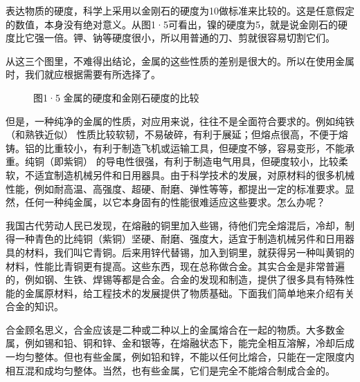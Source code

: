 表达物质的硬度，科学上采用以金刚石的硬度为10做标准来比较的。这是任意假定的数值，本身没有绝对意义。从图1·5可看出，镍的硬度为5，就是说金刚石的硬度比它强一倍。钾、钠等硬度很小，所以用普通的刀、剪就很容易切割它们。

从这三个图里，不难得出结论，金属的这些性质的差别是很大的。所以在使用金属时，我们就应根据需要有所选择了。

\begin{figure}
\centering
{}
\caption{图1·5 金属的硬度和金刚石硬度的比较}
\end{figure}

但是，一种纯净的金属的性质，对应用来说，往往不是全面符合要求的。例如纯铁（和熟铁近似）
性质比较软韧，不易破碎，有利于展延；但熔点很高，不便于熔铸。铝的比重较小，有利于制造飞机或运输工具，但硬度不够，容易变形，不能承重。纯铜（即紫铜）
的导电性很强，有利于制造电气用具，但硬度较小，比较柔软，不适宜制造机械另件和日用器具。由于科学技术的发展，对原材料的很多机械性能，例如耐高温、高强度、超硬、耐磨、弹性等等，都提出一定的标准要求。显然，任何一种纯金属，以它本身固有的性能很难适应这些要求。怎么办呢？

我国古代劳动人民已发现，在熔融的铜里加入些锡，待他们完全熔混后，冷却，制得一种青色的比纯铜（紫铜）坚硬、耐磨、强度大，适宜于制造机械另件和日用器具的材料，我们叫它青铜。后来用锌代替锡，加入到铜里，就获得另一种叫黄铜的材料，性能比青铜更有提高。这些东西，现在总称做合金。其实合金是非常普遍的，例如钢、生铁、焊锡等都是合金。合金的发现和制造，提供了很多具有特殊性能的金属原材料，给工程技术的发展提供了物质基础。下面我们简单地来介绍有关合金的知识。

合金顾名思义，合金应该是二种或二种以上的金属熔合在一起的物质。大多数金属，例如锡和铅、铜和锌、金和银等，在熔融状态下，能完全相互溶解，冷却后成一均匀整体。但也有些金属，例如铅和锌，不能以任何比熔合，只能在一定限度内相互混和成均匀整体。当然，也有些金属，它们是完全不能熔合制成合金的。

